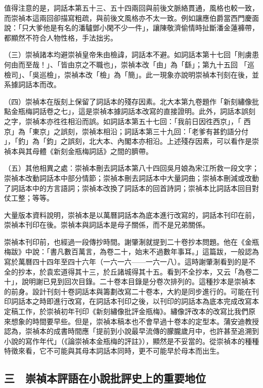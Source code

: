 值得注意的是，詞話本第五十三、五十四兩回與前後文脈絡貫通，風格也較一致，而崇禎本這兩回卻描寫粗疏，與前後文風格亦不太一致。例如讓應伯爵當西門慶面說：「只大爹他是有名的潘驢鄧小閑不少一件」，讓陳敬濟偷情時扯斷潘金蓮褲帶，都顯然不符合人物性格，手法拙劣。

（三）崇禎諸本均避崇禎皇帝朱由檢諱，詞話本不避。如詞話本第十七回「則虜患何由而至哉！」、「皆由京之不職也」，崇禎本改「由」為「繇」；第九十五回 「巡檢司」、「吳巡檢」，崇禎本改「檢」為「簡」。此一現象亦說明崇禎本刊刻在後，並系據詞話本而改。

（四）崇禎本在版刻上保留了詞話本的殘存因素。北大本第九卷題作「新刻繡像批點金瓶梅詞話卷之七」，這是崇禎本據詞話本改寫的直接證明。此外，詞話本誤刻之字，崇禎本亦徃徃相沿而誤。如詞話本第五十七回：「我前日因徃西京」，「 西京」為「東京」之誤刻，崇禎本相沿；詞話本第三十九回：「老爹有甚釣語分付 」，「釣」為「鈞」之誤刻，北大本、內閣本亦相沿。上述殘存因素，可以看作是崇禎本與其母體《新刻金瓶梅詞話》之間的臍帶。

（五）其他相異之處：崇禎本刪去詞話本第八十四回吳月娘為宋江所救一段文字；崇禎本改動詞話本中部分情節；崇禎本刪去詞話本中大量詞曲；崇禎本刪減或改動了詞話本中的方言語詞；崇禎本改換了詞話本的回首詩詞；崇禎本比詞話本回目對仗工整；等等。

大量版本資料說明，崇禎本是以萬曆詞話本為底本進行改寫的，詞話本刊印在前，崇禎本刊印在後。崇禎本與詞話本是母子關係，而不是兄弟關係。

崇禎本刊印前，也經過一段傳抄時間。謝肇淛就提到二十卷抄本問題。他在《金瓶梅跋》中說：「書凡數百萬言，為卷二十，始末不過數年事耳。」這篇跋，一般認為寫於萬曆四十四年至四十六年（一六一六——一六一八）。這時謝肇淛看到的是不全的抄本，於袁宏道得其十三，於丘諸城得其十五。看到不全抄本，又云「為卷二十」，說明謝已見到回次目錄。二十卷本目錄是分卷次排列的。這種抄本是崇禎本的前身。設計刊刻十卷詞話本與籌劃改寫二十卷本，大約是同步進行的。可能在刊印詞話本之時即進行改寫，在詞話本刊印之後，以刊印的詞話本為底本完成改寫本定稿工作，於崇禎初年刊印《新刻繡像批評金瓶梅》。繡像評改本的改寫比我們原來想象的時間要早些。但是，崇禎本稿本也不會早過十卷本的定型本。蒲安迪教授認為，崇禎本的成書時間應「提前到小說最早流傳的朦朧歲月中，也許甚至追溯到小說的寫作年代」（《論崇禎本金瓶梅的評註》），顯然是不妥當的。從崇禎本的種種特徵來看，它不可能與其母本詞話本同時，更不可能早於母本而出生。

\subsection*{三　崇禎本評語在小說批評史上的重要地位}

